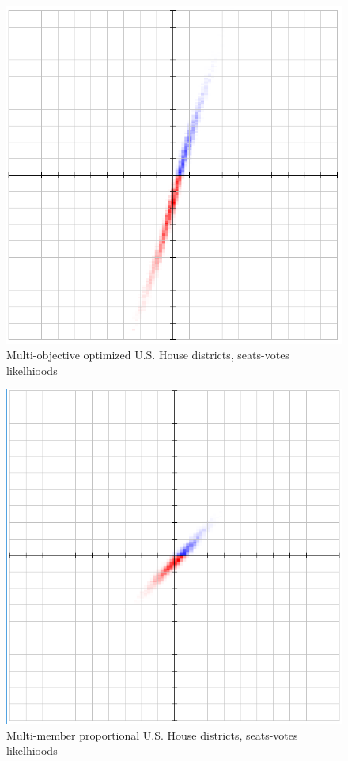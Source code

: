 \documentclass[preprint,12pt]{article}
\begin{document}
\begin{figure}[htb!]
    \begin{center}
        \includegraphics[scale=0.5]{Figures/original_method/SM__ush.png}
        \caption{Multi-objective optimized U.S. House districts, seats-votes likelhioods}\label{fig:SM_ush}
    \end{center}
\end{figure}
\begin{figure}[htb!]
    \begin{center}
        \includegraphics[scale=0.5]{Figures/original_method/fv_ush.png}
        \caption{Multi-member proportional U.S. House districts, seats-votes likelhioods}\label{fig:SM_ush}
    \end{center}
\end{figure}
\end{document}
